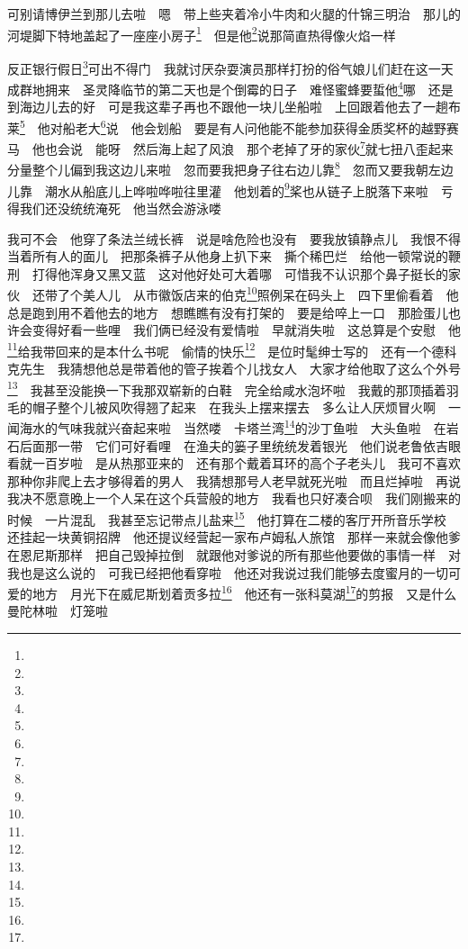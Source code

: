 \par 可别请博伊兰到那儿去啦　嗯　带上些夹着冷小牛肉和火腿的什锦三明治　那儿的河堤脚下特地盖起了一座座小房子\footnote{}　但是他\footnote{}说那简直热得像火焰一样　
\par 反正银行假日\footnote{}可出不得门　我就讨厌杂耍演员那样打扮的俗气娘儿们赶在这一天成群地拥来　圣灵降临节的第二天也是个倒霉的日子　难怪蜜蜂要蜇他\footnote{}哪　还是到海边儿去的好　可是我这辈子再也不跟他一块儿坐船啦　上回跟着他去了一趟布莱\footnote{}　他对船老大\footnote{}说　他会划船　要是有人问他能不能参加获得金质奖杯的越野赛马　他也会说　能呀　然后海上起了风浪　那个老掉了牙的家伙\footnote{}就七扭八歪起来　分量整个儿偏到我这边儿来啦　忽而要我把身子往右边儿靠\footnote{}　忽而又要我朝左边儿靠　潮水从船底儿上哗啦哗啦往里灌　他划着的\footnote{}桨也从链子上脱落下来啦　亏得我们还没统统淹死　他当然会游泳喽　
\par 我可不会　他穿了条法兰绒长裤　说是啥危险也没有　要我放镇静点儿　我恨不得当着所有人的面儿　把那条裤子从他身上扒下来　撕个稀巴烂　给他一顿常说的鞭刑　打得他浑身又黑又蓝　这对他好处可大着哪　可惜我不认识那个鼻子挺长的家伙　还带了个美人儿　从市徽饭店来的伯克\footnote{}照例呆在码头上　四下里偷看着　他总是跑到用不着他去的地方　想瞧瞧有没有打架的　要是给啐上一口　那脸蛋儿也许会变得好看一些哩　我们俩已经没有爱情啦　早就消失啦　这总算是个安慰　他\footnote{}给我带回来的是本什么书呢　偷情的快乐\footnote{}　是位时髦绅士写的　还有一个德科克先生　我猜想他总是带着他的管子挨着个儿找女人　大家才给他取了这么个外号\footnote{}　我甚至没能换一下我那双崭新的白鞋　完全给咸水泡坏啦　我戴的那顶插着羽毛的帽子整个儿被风吹得翘了起来　在我头上摆来摆去　多么让人厌烦冒火啊　一闻海水的气味我就兴奋起来啦　当然喽　卡塔兰湾\footnote{}的沙丁鱼啦　大头鱼啦　在岩石后面那一带　它们可好看哩　在渔夫的篓子里统统发着银光　他们说老鲁依吉眼看就一百岁啦　是从热那亚来的　还有那个戴着耳环的高个子老头儿　我可不喜欢那种你非爬上去才够得着的男人　我猜想那号人老早就死光啦　而且烂掉啦　再说我决不愿意晚上一个人呆在这个兵营般的地方　我看也只好凑合呗　我们刚搬来的时候　一片混乱　我甚至忘记带点儿盐来\footnote{}　他打算在二楼的客厅开所音乐学校　还挂起一块黄铜招牌　他还提议经营起一家布卢姆私人旅馆　那样一来就会像他爹在恩尼斯那样　把自己毁掉拉倒　就跟他对爹说的所有那些他要做的事情一样　对我也是这么说的　可我已经把他看穿啦　他还对我说过我们能够去度蜜月的一切可爱的地方　月光下在威尼斯划着贡多拉\footnote{}　他还有一张科莫湖\footnote{}的剪报　又是什么曼陀林啦　灯笼啦　
